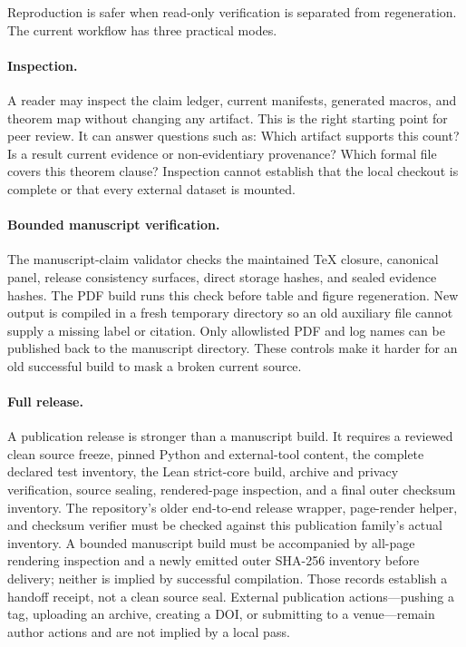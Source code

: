Reproduction is safer when read-only verification is separated from regeneration.  The current
workflow has three practical modes.

\paragraph{Inspection.}
A reader may inspect the claim ledger, current manifests, generated macros, and theorem map without
changing any artifact.  This is the right starting point for peer review.  It can answer questions
such as: Which artifact supports this count?  Is a result current evidence or non-evidentiary
provenance?  Which formal file covers this theorem clause?  Inspection cannot establish that the
local checkout is complete or that every external dataset is mounted.

\paragraph{Bounded manuscript verification.}
The manuscript-claim validator checks the maintained TeX closure, canonical panel, release
consistency surfaces, direct storage hashes, and sealed evidence hashes.  The PDF build runs this
check before table and figure regeneration.  New output is compiled in a fresh temporary directory
so an old auxiliary file cannot supply a missing label or citation.  Only allowlisted PDF and log
names can be published back to the manuscript directory.  These controls make it harder for an old
successful build to mask a broken current source.

\paragraph{Full release.}
A publication release is stronger than a manuscript build.  It requires a reviewed clean source
freeze, pinned Python and external-tool content, the complete declared test inventory, the Lean
strict-core build, archive and privacy verification, source sealing, rendered-page inspection, and
a final outer checksum inventory.  The repository's older end-to-end release wrapper, page-render
helper, and checksum verifier must be checked against this publication family's actual inventory.
A bounded manuscript build must be accompanied by all-page rendering inspection and a newly
emitted outer SHA-256 inventory before delivery; neither is implied by successful compilation.
Those records establish a handoff receipt, not a clean source seal.
External publication actions---pushing a tag, uploading an archive, creating a DOI, or
submitting to a venue---remain author actions and are not implied by a local pass.


